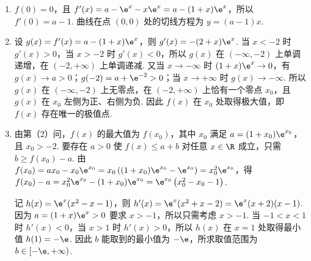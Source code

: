 \begin{solution}
\begin{enumerate}
\item \(f(0)=0\)，且 \(f'(x)=a-\e^x-x\e^x=a-(1+x)\e^x\)，所以 \(f'(0)=a-1\). 曲线在点 \((0,0)\) 处的切线方程为 \(y=(a-1)x\).

\item 设 \(g(x)=f'(x)=a-(1+x)\e^x\)，则 \(g'(x)=-(2+x)\e^x\). 当 \(x<-2\) 时 \(g'(x)>0\)，当 \(x>-2\) 时 \(g'(x)<0\)，所以 \(g(x)\) 在 \((-\infty,-2)\) 上单调递增，在 \((-2,+\infty)\) 上单调递减. 又当 \(x\to-\infty\) 时 \((1+x)\e^x\to0\)，有 \(g(x)\to a>0\)；\(g(-2)=a+\e^{-2}>0\)；当 \(x\to+\infty\) 时 \(g(x)\to-\infty\). 所以 \(g(x)\) 在 \((-\infty,-2)\) 上无零点，在 \((-2,+\infty)\) 上恰有一个零点 \(x_0\)，且 \(g(x)\) 在 \(x_0\) 左侧为正、右侧为负. 因此 \(f(x)\) 在 \(x_0\) 处取得极大值，即 \(f(x)\) 存在唯一的极值点.

\item 由第（2）问，\(f(x)\) 的最大值为 \(f(x_0)\)，其中 \(x_0\) 满足 \(a=(1+x_0)\e^{x_0}\)，且 \(x_0>-2\). 要存在 \(a>0\) 使 \(f(x)\le a+b\) 对任意 \(x\in\R\) 成立，只需 \(b\ge f(x_0)-a\). 由 \(f(x_0)=ax_0-x_0\e^{x_0}=x_0\left((1+x_0)\e^{x_0}-\e^{x_0}\right)=x_0^2\e^{x_0}\)，得 \(f(x_0)-a=x_0^2\e^{x_0}-(1+x_0)\e^{x_0}=\e^{x_0}\left(x_0^2-x_0-1\right)\).

记 \(h(x)=\e^x(x^2-x-1)\)，则 \(h'(x)=\e^x(x^2+x-2)=\e^x(x+2)(x-1)\). 因为 \(a=(1+x)\e^x>0\) 要求 \(x>-1\)，所以只需考虑 \(x>-1\). 当 \(-1<x<1\) 时 \(h'(x)<0\)，当 \(x>1\) 时 \(h'(x)>0\)，所以 \(h(x)\) 在 \(x=1\) 处取得最小值 \(h(1)=-\e\). 因此 \(b\) 能取到的最小值为 \(-\e\)，所求取值范围为 \(b\in[-\e,+\infty)\).
\end{enumerate}
\end{solution}
